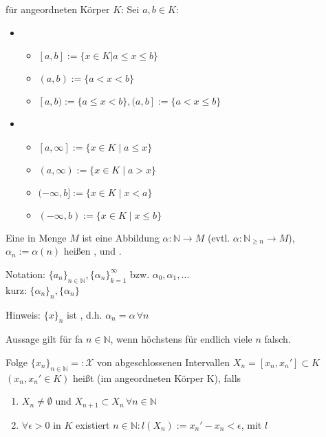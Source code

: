 \begin{definition}[Intervall]
	 für angeordneten Körper $K$: Sei $a,b\in K$:
	\begin{itemize}
		\item {}
		\begin{itemize}
			\item $[a,b]:=\{ x\in K | a \le x \le b \}$ 
			\item $(a,b):=\{a < x < b\}$ 
			\item $[a,b) := \{a \le x < b\}, (a,b]:=\{a < x \le b\}$ 
		\end{itemize}
		\item {}
		\begin{itemize}
			\item $[a,\infty]:=\{x\in K\mid a \le x\}$
			\item $(a,\infty):=\{x\in K\mid a > x\}$
            \item $(-\infty, b]:= \{x \in K \mid x< a\}$
            \item $(-\infty, b) := \{x\in K\mid x \leq b\}$
		\end{itemize}
	\end{itemize}
\end{definition}

\begin{definition}[Folge]
    Eine  in Menge $M$ ist eine Abbildung $\alpha:\mathbb{N}\rightarrow M$ (evtl. $\alpha:\mathbb{N}_{\ge n}\rightarrow M$), $\alpha_n := \alpha(n)$ heißen , und .
    
	Notation: $\{a_n\}_{n\in\mathbb{N}}, \{\alpha_n\}_{k=1}^\infty$ bzw. $\alpha_0, \alpha_1, \dotsc$\\
	kurz: $\{\alpha_n\}_n, \{\alpha_n \}$
		
	Hinweis: $\{x\}_n$ ist , d.h. $\alpha_n = \alpha\,\forall n$
\end{definition}

Aussage gilt für \gls{fa} $n\in\mathbb{N}$, wenn höchstens für endlich viele $n$ falsch.

\begin{definition}[Intervallschachtelung]
	Folge $\{x_n\}_{n\in\mathbb{N}} =:\mathcal{X}$ von abgeschlossenen Intervallen $X_n=[x_n, x_n']\subset K$ $(x_n, x_n'\in K)$ heißt  (im angeordneten Körper K), falls
	\begin{enumerate}[label={\alph*)}]
		\item $X_n\neq \emptyset$ und $X_{n+1}\subset X_n\,\forall n\in\mathbb{N}$
		\item $\forall\epsilon > 0$ in $K$ existiert $n\in\mathbb{N}: l(X_n):= x_n' - x_n < \epsilon$, mit $l$ 
	\end{enumerate}
\end{definition}

